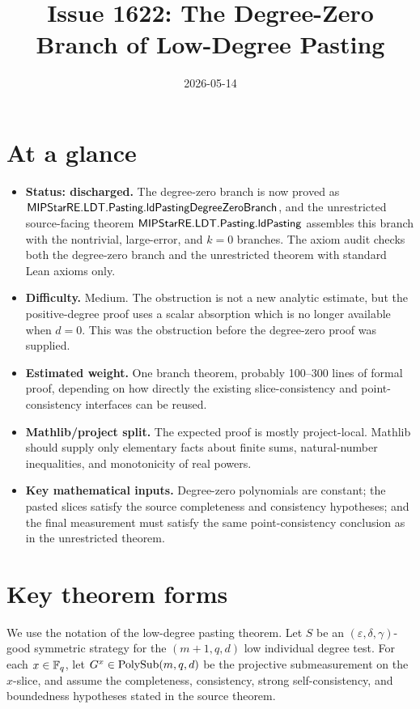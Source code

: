 \documentclass{article}
\title{Issue 1622: The Degree-Zero Branch of Low-Degree Pasting}
\author{}
\date{2026-05-14}
\begin{document}
\maketitle

\section{At a glance}

\begin{itemize}
  \item \textbf{Status: discharged.}  The degree-zero branch is now proved as
  \(\textsf{MIPStarRE.LDT.Pasting.ldPastingDegreeZeroBranch}\), and the
  unrestricted source-facing theorem
  \(\textsf{MIPStarRE.LDT.Pasting.ldPasting}\) assembles this branch with the
  nontrivial, large-error, and \(k=0\) branches.  The axiom audit checks both
  the degree-zero branch and the unrestricted theorem with standard Lean axioms
  only.
  \item \textbf{Difficulty.}  Medium.  The obstruction is not a new analytic
  estimate, but the positive-degree proof uses a scalar absorption which is no
  longer available when \(d=0\).  This was the obstruction before the
  degree-zero proof was supplied.
  \item \textbf{Estimated weight.}  One branch theorem, probably 100--300 lines
  of formal proof, depending on how directly the existing slice-consistency and
  point-consistency interfaces can be reused.
  \item \textbf{Mathlib/project split.}  The expected proof is mostly
  project-local.  Mathlib should supply only elementary facts about finite sums,
  natural-number inequalities, and monotonicity of real powers.
  \item \textbf{Key mathematical inputs.}  Degree-zero polynomials are constant;
  the pasted slices satisfy the source completeness and consistency hypotheses;
  and the final measurement must satisfy the same point-consistency conclusion
  as in the unrestricted theorem.
\end{itemize}

\section{Key theorem forms}

We use the notation of the low-degree pasting theorem.  Let \(S\) be an
\((\varepsilon,\delta,\gamma)\)-good symmetric strategy for the
\((m+1,q,d)\) low individual degree test.  For each \(x\in\mathbb{F}_q\), let
\(G^x\in\mathrm{PolySub}(m, q, d)\) be the projective submeasurement on the \(x\)-slice,
and assume the completeness, consistency, strong self-consistency, and
boundedness hypotheses stated in the source theorem.
\end{document}
